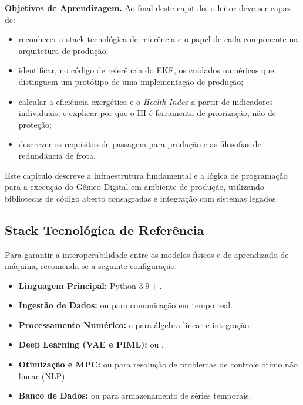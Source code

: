 \documentclass[12pt,a4paper]{article}
\numberwithin{equation}{section}
\numberwithin{table}{section}
\numberwithin{figure}{section}
\begin{document}
	\textbf{Objetivos de Aprendizagem.} Ao final deste capítulo, o leitor
	deve ser capaz de:
	\begin{itemize}
		\item reconhecer a stack tecnológica de referência e o papel de
		cada componente na arquitetura de produção;
		\item identificar, no código de referência do EKF, os cuidados
		numéricos que distinguem um protótipo de uma implementação de
		produção;
		\item calcular a eficiência exergética e o \textit{Health Index}
		a partir de indicadores individuais, e explicar por que o HI é
		ferramenta de priorização, não de proteção;
		\item descrever os requisitos de passagem para produção e as
		filosofias de redundância de frota.
	\end{itemize}

	Este capítulo descreve a infraestrutura fundamental e a lógica de programação para a execução do Gêmeo Digital em ambiente de produção, utilizando bibliotecas de código aberto consagradas e integração com sistemas legados.
	
	\subsection{Stack Tecnológica de Referência}
	Para garantir a interoperabilidade entre os modelos físicos e de aprendizado de máquina, recomenda-se a seguinte configuração:
	\begin{itemize}
		\item \textbf{Linguagem Principal:} Python $3.9+$.
		\item \textbf{Ingestão de Dados:}  ou  para comunicação em tempo real.
		\item \textbf{Processamento Numérico:}  e  para álgebra linear e integração.
		\item \textbf{Deep Learning (VAE e PIML):}  ou .
		\item \textbf{Otimização e MPC:}  ou  para resolução de problemas de controle ótimo não linear (NLP).
		\item \textbf{Banco de Dados:}  ou  para armazenamento de séries temporais.
	\end{itemize}
	
\end{document}
